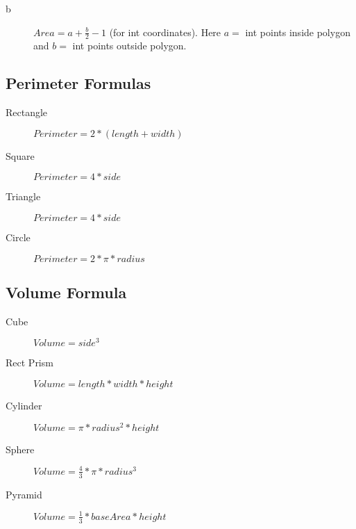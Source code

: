 \documentclass[10pt, a4paper]{article}
\begin{document}
\begin{multicols}{2}
\begin{description}
\begin{description}
            \item[b] 
            \begin{math}
                Area = a + \frac{b}{2} - 1
            \end{math}
            (for int coordinates). Here $a=$ int points inside polygon and $b=$ int points outside polygon. 
        \end{description}
        
\end{description}
\subsection{Perimeter Formulas}
\begin{description}
    \item[Rectangle] 
        \begin{math}
            Perimeter = 2 *(length + width)
        \end{math}
    \item[Square] 
        \begin{math}
            Perimeter = 4 * side
        \end{math}
    \item[Triangle] 
        \begin{math}
            Perimeter = 4 * side
        \end{math}
    \item[Circle] 
        \begin{math}
            Perimeter = 2 * \pi * radius
        \end{math}
        
\end{description}

\subsection{Volume Formula}
\begin{description}
    \item[Cube] 
        \begin{math}
            Volume = side ^ 3
        \end{math}
    \item[Rect Prism] 
        \begin{math}
            Volume = length * width * height
        \end{math}
    \item[Cylinder] 
        \begin{math}
            Volume = \pi * radius ^2 *height
        \end{math}
    \item[Sphere] 
        \begin{math}
            Volume = \frac{4}{3}*\pi*radius^3
        \end{math}
    \item[Pyramid] 
        \begin{math}
            Volume = \frac{1}{3} *baseArea *height
        \end{math}
\end{description}


\end{multicols}
\end{document}
